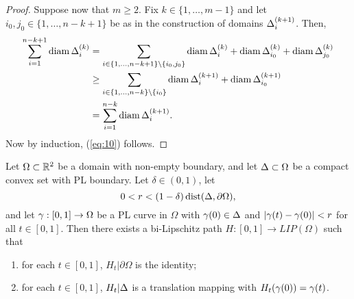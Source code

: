 \documentclass{amsart}
\begin{document}
\begin{proof}
Suppose now that $m\geq 2$. Fix $k\in \{1,\dots,m-1\}$ and let $i_0,j_0 \in \{1,\dots,n-k+1\}$ be as in the construction of domains $\Delta_{i}^{(k+1)}$. Then,
\begin{align*}
\sum_{i=1}^{n-k+1} \operatorname{diam}{\Delta_i^{(k)}} &= \sum_{i \in\{1,\dots,n-k+1\}\setminus\{i_0,j_0\}} \operatorname{diam}{\Delta_i^{(k)}} + \operatorname{diam}{\Delta_{i_0}^{(k)}} + \operatorname{diam}{\Delta_{j_0}^{(k)}}\\
&\geq \sum_{i \in\{1,\dots,n-k\}\setminus\{i_0\}} \operatorname{diam}{\Delta_i^{(k+1)}} +  \operatorname{diam}{\Delta_{i_0}^{(k+1)}}\\
&= \sum_{i=1}^{n-k} \operatorname{diam}{\Delta_i^{(k+1)}}. 
\end{align*}
Now by induction, (\ref{eq:10}) follows.
\end{proof}

\begin{comment}
Given a convex set $\D \subset \R^N$, a PL curve $\g:[0,1] \to \R^N$ with $\g(0) \in \D$, and a number $r>0$ we denote
\[ \mathcal{N}(H,\g,r) := \bigcup_{t\in[0,1]}\bigcup_{x\in H} \overline{B}(x+\g(t),r).\]
\end{comment}

\begin{lemma}\label{lem:1}
Let $\Omega \subset\mathbb{R}^2$ be a domain with non-empty boundary, and let $\Delta \subset \Omega$ be a compact convex set with PL boundary. Let $\delta\in (0,1)$, let 
\[ 0 < r< (1-\delta) \operatorname{dist}(\Delta , \partial \Omega), \] 
and let $\gamma:[0,1] \to \Omega$ be a PL curve in $\Omega$ with $\gamma(0)\in \Delta$ and $|\gamma(t) - \gamma(0)| <r$ for all $t\in [0,1]$. Then there exists a bi-Lipschitz path $H:[0,1] \to LIP(\Omega)$ such that
\begin{enumerate}
\item for each $t\in[0,1]$, $H_t| \partial \Omega$ is the identity;
\item for each $t\in[0,1]$, $H_t| \Delta$ is a translation mapping with $H_t(\gamma(0))=\gamma(t)$.
\end{enumerate}
\end{lemma}
\end{document}
